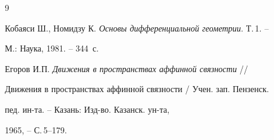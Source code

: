 \begin{thebibliography}{9} 


 




Кобаяси Ш., Номидзу К. {\em Основы дифференциальной геометрии}. Т.\,1. --  


М.: Наука, 1981. -- 344~с. 




Егоров И.П. {\em Движения в пространствах аффинной связности} // 


Движения в пространствах аффинной связности / Учен. зап. Пензенск. 


пед. ин-та. -- Казань: Изд-во. Казанск. ун-та, 


1965, -- С.\,5--179. 


 


 


 


\end{thebibliography} 


 


\vskip 2cm 


 






 


\label{end} 


 


